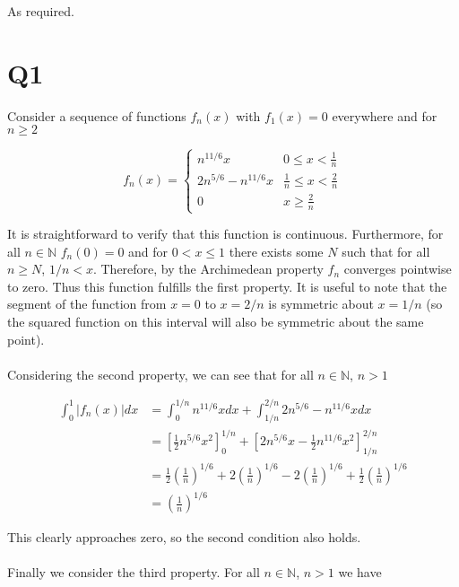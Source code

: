 \documentclass{article}
\begin{document}
As required.

\section*{Q1}
Consider a sequence of functions $f_n(x)$ with $f_1(x) = 0$ everywhere and for $n \geq 2$ 

\begin{equation*}
    f_n(x) = \begin{cases}
        n^{11/6}x & 0 \leq x < \frac{1}{n} \\
        2n^{5/6} - n^{11/6}x & \frac{1}{n} \leq x <\frac{2}{n} \\
        0 & x \geq \frac{2}{n}
    \end{cases}
\end{equation*}

It is straightforward to verify that this function is continuous. Furthermore, for all $n \in \mathbb{N}$ 
$f_n(0) = 0$ and for $0 < x \leq 1$ there exists some $N$ such that for all $n \geq N$, $1/n < x$. Therefore, 
by the Archimedean property $f_n$ converges pointwise to zero. Thus this function fulfills the 
first property. It is useful to note that the segment of the function from $x =0$ to $x = 2/n$ is 
symmetric about $x = 1/n$ (so the squared function on this interval will also be symmetric about 
the same point).

\paragraph{}
Considering the second property, we can see that for all $n \in \mathbb{N}$, $n >1$

\begin{align*}
    \int_0^1 |f_n(x)|dx &= \int_{0}^{1/n}n^{11/6}xdx + \int_{1/n}^{2/n}2n^{5/6} - n^{11/6}x dx \\
    &= \left[\frac{1}{2}n^{5/6}x^2\right]_0^{1/n} + \left[2n^{5/6}x - \frac{1}{2}n^{11/6}x^2\right]_{1/n}^{2/n} \\
    &= \frac{1}{2}\left(\frac{1}{n}\right)^{1/6} + 2\left(\frac{1}{n}\right)^{1/6} -2\left(\frac{1}{n}\right)^{1/6} + \frac{1}{2}\left(\frac{1}{n}\right)^{1/6} \\
    &= \left(\frac{1}{n}\right)^{1/6}
\end{align*}

This clearly approaches zero, so the second condition also holds.

\paragraph{}
Finally we consider the third property. For all $n \in \mathbb{N}$, $n > 1$ we have 
\end{document}
